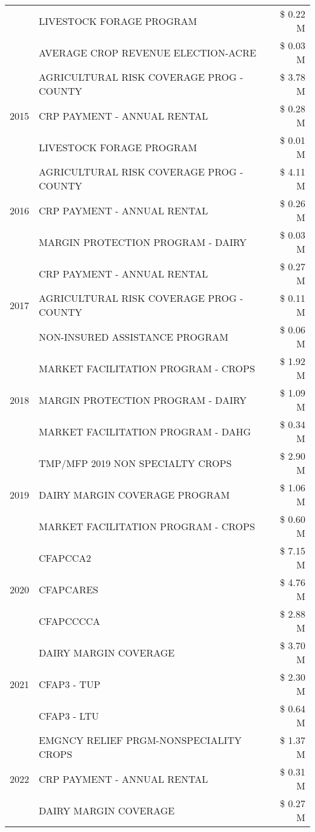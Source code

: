 \begin{tabular}{llr}
 & LIVESTOCK FORAGE PROGRAM & \$ 0.22 M \\
 & AVERAGE CROP REVENUE ELECTION-ACRE & \$ 0.03 M \\
\cline{1-3}
\multirow[t]{3}{*}{2015} & AGRICULTURAL RISK COVERAGE PROG - COUNTY & \$ 3.78 M \\
 & CRP PAYMENT - ANNUAL RENTAL & \$ 0.28 M \\
 & LIVESTOCK FORAGE PROGRAM & \$ 0.01 M \\
\cline{1-3}
\multirow[t]{3}{*}{2016} & AGRICULTURAL RISK COVERAGE PROG - COUNTY & \$ 4.11 M \\
 & CRP PAYMENT - ANNUAL RENTAL & \$ 0.26 M \\
 & MARGIN PROTECTION PROGRAM - DAIRY & \$ 0.03 M \\
\cline{1-3}
\multirow[t]{3}{*}{2017} & CRP PAYMENT - ANNUAL RENTAL & \$ 0.27 M \\
 & AGRICULTURAL RISK COVERAGE PROG - COUNTY & \$ 0.11 M \\
 & NON-INSURED ASSISTANCE PROGRAM & \$ 0.06 M \\
\cline{1-3}
\multirow[t]{3}{*}{2018} & MARKET FACILITATION PROGRAM - CROPS & \$ 1.92 M \\
 & MARGIN PROTECTION PROGRAM - DAIRY & \$ 1.09 M \\
 & MARKET FACILITATION PROGRAM - DAHG & \$ 0.34 M \\
\cline{1-3}
\multirow[t]{3}{*}{2019} & TMP/MFP 2019 NON SPECIALTY CROPS & \$ 2.90 M \\
 & DAIRY MARGIN COVERAGE PROGRAM & \$ 1.06 M \\
 & MARKET FACILITATION PROGRAM - CROPS & \$ 0.60 M \\
\cline{1-3}
\multirow[t]{3}{*}{2020} & CFAPCCA2 & \$ 7.15 M \\
 & CFAPCARES & \$ 4.76 M \\
 & CFAPCCCCA & \$ 2.88 M \\
\cline{1-3}
\multirow[t]{3}{*}{2021} & DAIRY MARGIN COVERAGE & \$ 3.70 M \\
 & CFAP3 - TUP & \$ 2.30 M \\
 & CFAP3 - LTU & \$ 0.64 M \\
\cline{1-3}
\multirow[t]{3}{*}{2022} & EMGNCY RELIEF PRGM-NONSPECIALITY CROPS & \$ 1.37 M \\
 & CRP PAYMENT - ANNUAL RENTAL & \$ 0.31 M \\
 & DAIRY MARGIN COVERAGE & \$ 0.27 M \\
\cline{1-3}
\bottomrule
\end{tabular}
